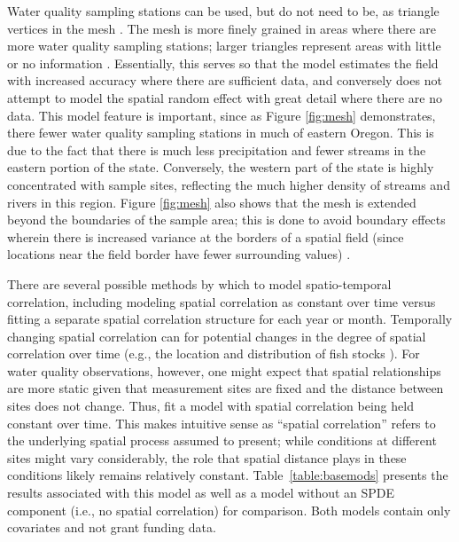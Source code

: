 \documentclass[12pt,a4paper,titlepage]{article}
\begin{document}
Water quality sampling stations can be used, but do not need to be, as triangle vertices in the mesh \parencite{lindgren2011}. The mesh is more finely grained in areas where there are more water quality sampling stations; larger triangles represent areas with little or no information \parencite{cosandey-godin2014}. Essentially, this serves so that the model estimates the field with increased accuracy where there are sufficient data, and conversely does not attempt to model the spatial random effect with great detail where there are no data. This model feature is important, since as Figure \ref{fig:mesh} demonstrates, there fewer water quality sampling stations in much of eastern Oregon. This is due to the fact that there is much less precipitation and fewer streams in the eastern portion of the state. Conversely, the western part of the state is highly concentrated with sample sites, reflecting the much higher density of streams and rivers in this region. Figure \ref{fig:mesh} also shows that the mesh is extended beyond the boundaries of the sample area; this is done to avoid boundary effects wherein there is increased variance at the borders of a spatial field (since locations near the field border have fewer surrounding values) \parencite{lindgren2013}.

There are several possible methods by which to model spatio-temporal correlation, including modeling spatial correlation as constant over time versus fitting a separate spatial correlation structure for each year or month. Temporally changing spatial correlation can for potential changes in the degree of spatial correlation over time (e.g., the location and distribution of fish stocks \parencite{cosandey-godin2014}). For water quality observations, however, one might expect that spatial relationships are more static given that measurement sites are fixed and the distance between sites does not change. Thus, fit a model with spatial correlation being held constant over time. This makes intuitive sense as  “spatial correlation” refers to the underlying spatial process assumed to present; while conditions at different sites might vary considerably, the role that spatial distance plays in these conditions likely remains relatively constant. Table~\ref{table:basemods} presents the results associated with this model as well as a model without an SPDE component (i.e., no spatial correlation) for comparison. Both models contain only covariates and not grant funding data. 


\end{document}
